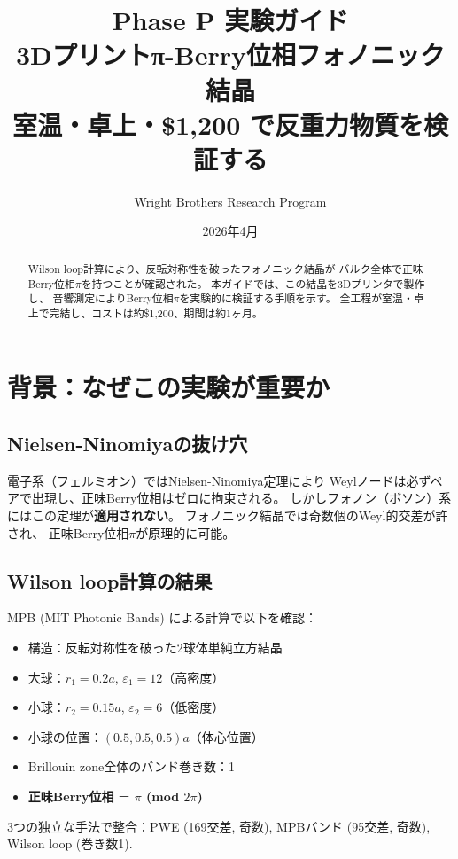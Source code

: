 \documentclass[11pt,a4paper]{article}
\title{Phase P 実験ガイド\\[6pt]
\large 3Dプリントπ-Berry位相フォノニック結晶\\
室温・卓上・\$1,200 で反重力物質を検証する}
\author{Wright Brothers Research Program}
\date{2026年4月}
\begin{document}
\maketitle

\begin{abstract}
Wilson loop計算により、反転対称性を破ったフォノニック結晶が
バルク全体で正味Berry位相$\pi$を持つことが確認された。
本ガイドでは、この結晶を3Dプリンタで製作し、
音響測定によりBerry位相$\pi$を実験的に検証する手順を示す。
全工程が室温・卓上で完結し、コストは約\$1,200、期間は約1ヶ月。
\end{abstract}

\tableofcontents
\newpage

\section{背景：なぜこの実験が重要か}

\subsection{Nielsen-Ninomiyaの抜け穴}

電子系（フェルミオン）ではNielsen-Ninomiya定理により
Weylノードは必ずペアで出現し、正味Berry位相はゼロに拘束される。
しかしフォノン（ボソン）系にはこの定理が\textbf{適用されない}。
フォノニック結晶では奇数個のWeyl的交差が許され、
正味Berry位相$\pi$が原理的に可能。

\subsection{Wilson loop計算の結果}

MPB (MIT Photonic Bands) による計算で以下を確認：
\begin{tcolorbox}[colback=green!5,colframe=green!60!black,title=Wilson loop結果]
\begin{itemize}
\item 構造：反転対称性を破った2球体単純立方結晶
\item 大球：$r_1 = 0.2a$, $\varepsilon_1 = 12$（高密度）
\item 小球：$r_2 = 0.15a$, $\varepsilon_2 = 6$（低密度）
\item 小球の位置：$(0.5, 0.5, 0.5)a$（体心位置）
\item Brillouin zone全体のバンド巻き数：1
\item \textbf{正味Berry位相 = $\pi$ (mod $2\pi$)}
\end{itemize}
3つの独立な手法で整合：PWE (169交差, 奇数), MPBバンド (95交差, 奇数), Wilson loop (巻き数1).
\end{tcolorbox}
\end{document}
